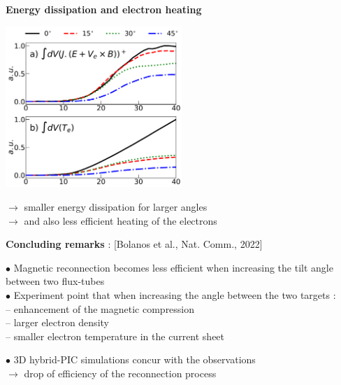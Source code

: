\documentclass[landscape]{slides}
\begin{document}
\begin{slide}
\large{\textbf{Energy dissipation and electron heating}}

\begin{center}
\includegraphics[width=0.5\textwidth]{je_te}
\end{center}

$\rightarrow$ smaller energy dissipation for larger angles\\
$\rightarrow$ and also less efficient heating of the electrons

\end{slide}

\begin{slide}
    \large{\textbf{Concluding remarks} : [Bolanos et al., Nat. Comm., 2022]}

$\bullet$ Magnetic reconnection becomes less efficient when increasing the tilt angle between two flux-tubes\\
$\bullet$ Experiment point that when increasing the angle between the two targets :\\
-- enhancement of the magnetic compression\\
-- larger electron density\\
-- smaller electron temperature in the current sheet

$\bullet$ 3D hybrid-PIC simulations concur with the observations\\
$\rightarrow$ drop of efficiency of the reconnection process

\end{slide}
\end{document}
